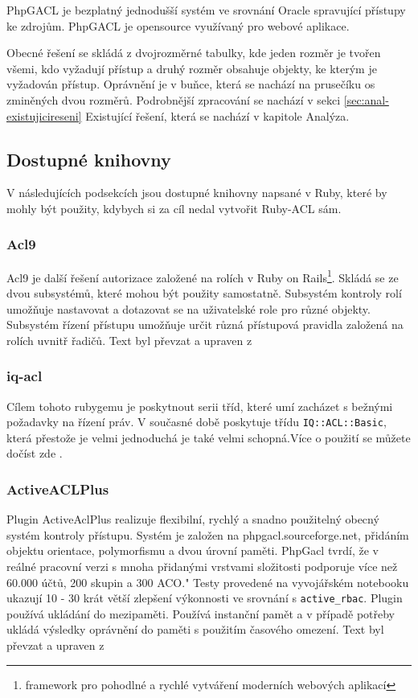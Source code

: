PhpGACL je bezplatný jednodušší systém ve srovnání Oracle spravující přístupy ke zdrojům. PhpGACL je opensource využívaný pro webové aplikace.

Obecné řešení se skládá z dvojrozměrné tabulky, kde jeden rozměr je tvořen všemi, kdo vyžadují přístup a druhý rozměr obsahuje objekty, ke kterým je vyžadován přístup. Oprávnění je v buňce, která se nachází na prusečíku os zminěných dvou rozměrů.
Podrobnější zpracování se nachází v sekci \ref{sec:anal-existujicireseni} Existující řešení, která se nachází v kapitole Analýza.

\subsection{Dostupné knihovny}
V následujících podsekcích jsou dostupné knihovny napsané v Ruby, které by mohly být použity, kdybych si za cíl nedal vytvořit Ruby-ACL sám.

\subsubsection{Acl9}
Acl9 je další řešení autorizace založené na rolích v Ruby on Rails\footnote{framework pro pohodlné a rychlé vytváření moderních webových aplikací}. Skládá se ze dvou subsystémů, které mohou být použity samostatně. Subsystém kontroly rolí umožňuje nastavovat a dotazovat se na uživatelské role pro různé objekty. 
Subsystém řízení přístupu umožňuje určit různá přístupová pravidla založená na rolích uvnitř řadičů. Text byl převzat a upraven z \cite{github:acl9}

\subsubsection{iq-acl}
Cílem tohoto rubygemu je poskytnout serii tříd, které umí zacházet s bežnými požadavky na řízení práv. V současné době poskytuje třídu \verb|IQ::ACL::Basic|, která přestože je velmi jednoduchá je také velmi schopná.Více o použití se můžete dočíst zde \cite{github:iq-acl}.

\subsubsection{ActiveACLPlus}
Plugin ActiveAclPlus realizuje flexibilní, rychlý a snadno použitelný obecný systém kontroly přístupu.
Systém je založen na phpgacl.sourceforge.net, přidáním objektu orientace, polymorfismu a dvou úrovní paměti. PhpGacl tvrdí, že v reálné pracovní verzi s mnoha přidanými vrstvami složitosti podporuje více než 60.000 účtů, 200 skupin a 300 ACO." Testy provedené na vyvojářském notebooku ukazují 10 - 30 krát větší zlepšení výkonnosti ve srovnání s \verb|active_rbac|.
Plugin používá ukládání do mezipaměti. Používá instanční pamět a v případě potřeby ukládá výsledky oprávnění do paměti s použitím časového omezení. Text byl převzat a upraven z \cite{rubyforge:ActiveAclPlus}